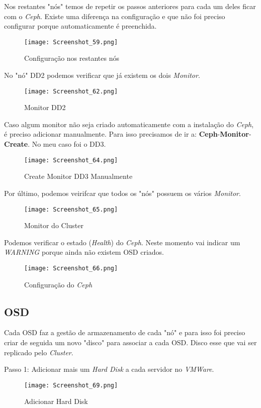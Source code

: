 \newpage
Nos restantes "nós" temos de repetir os passos anteriores para cada um deles ficar com o \textit{Ceph}.
Existe uma diferença na configuração e que não foi preciso configurar porque automaticamente é preenchida.
\begin{figure}[H]
\center
\texttt{[image: Screenshot\_59.png]}
\caption{Configuração nos restantes nós}
\end{figure}

No "nó" DD2 podemos verificar que já existem os dois \textit{Monitor}.
\begin{figure}[H]
\center
\texttt{[image: Screenshot\_62.png]}
\caption{Monitor DD2}
\end{figure}

\newpage
Caso algum monitor não seja criado automaticamente com a instalação do \textit{Ceph}, é preciso adicionar manualmente. Para isso precisamos de ir a: \textbf{Ceph}-\textbf{Monitor}-\textbf{Create}. No meu caso foi o DD3.
\begin{figure}[H]
\center
\texttt{[image: Screenshot\_64.png]}
\caption{Create Monitor DD3 Manualmente}
\end{figure}

Por último, podemos veirifcar que todos os "nós" possuem os vários \textit{Monitor}.
\begin{figure}[H]
\center
\texttt{[image: Screenshot\_65.png]}
\caption{Monitor do Cluster}
\end{figure}

\newpage
Podemos verificar o estado (\textit{Health}) do \textit{Ceph}. Neste momento vai indicar um \textit{WARNING} porque ainda não existem \ac{OSD} criados.
\begin{figure}[H]
\center
\texttt{[image: Screenshot\_66.png]}
\caption{Configuração do \textit{Ceph}}
\end{figure}

\subsection{OSD}
Cada \ac{OSD} faz a gestão de armazenamento de cada "nó" e para isso foi preciso criar de seguida um novo "disco" para associar a cada \ac{OSD}. Disco esse que vai ser replicado pelo \textit{Cluster}.

Passo 1: Adicionar mais um \textit{Hard Disk} a cada servidor no \textit{VMWare}.
\begin{figure}[H]
\center
\texttt{[image: Screenshot\_69.png]}
\caption{Adicionar Hard Disk}
\end{figure}

